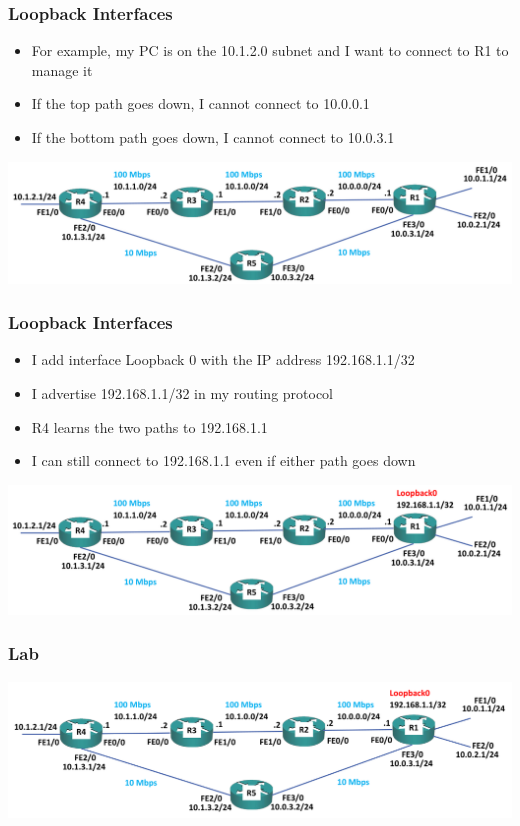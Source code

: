 \documentclass[pdflatex,compress,mathserif]{beamer}
\begin{document}
\begin{frame}
	\frametitle{Loopback Interfaces}
	\begin{itemize}
		\item For example, my PC is on the 10.1.2.0 subnet and I want to connect to R1
to manage it
		\item If the top path goes down, I cannot connect to 10.0.0.1
		\item If the bottom path goes down, I cannot connect to 10.0.3.1
	\end{itemize}
	\begin{center}
		\includegraphics[width=\linewidth]{img/img33}
	\end{center}
\end{frame}

\begin{frame}
	\frametitle{Loopback Interfaces}
	\begin{itemize}
		\item I add interface Loopback 0 with the IP address 192.168.1.1/32
		\item I advertise 192.168.1.1/32 in my routing protocol
		\item R4 learns the two paths to 192.168.1.1
		\item I can still connect to 192.168.1.1 even if either path goes down
	\end{itemize}
	\begin{center}
		\includegraphics[width=\linewidth]{img/img34}
	\end{center}
\end{frame}

\begin{frame}
	\frametitle{Lab}
	\begin{center}
		\includegraphics[width=\linewidth]{img/img35}
	\end{center}
\end{frame}
\end{document}
